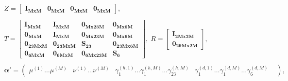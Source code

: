 \documentclass[11pt]{llncs} %
\begin{document}
\begin{center}
\begin{equation*}
\begin{array}{c}

Z =  \begin{bmatrix}
\mathbf{I_{MxM}} &  \mathbf{0_{M x M}} &  \mathbf{0_{M x M}} &  \mathbf{0_{M x M}} 
\end{bmatrix}, \\ \\

T =  \begin{bmatrix}
\mathbf{I_{MxM}} &  \mathbf{I_{M x M}} &  \mathbf{0_{M x 23M}} &  \mathbf{0_{M x 6M}} \\
\mathbf{0_{M x M}}& \mathbf{I_{MxM}} &  \mathbf{0_{M x 23M}} &  \mathbf{0_{M x 6M}}  \\
\mathbf{0_{23M x M}} &  \mathbf{0_{23M x M}} & \mathbf{S_{23}} &  \mathbf{0_{23M x 6M}} \\
 \mathbf{0_{6M x M}} &  \mathbf{0_{6M x M}} & \mathbf{0_{6M x 23M}} &  \mathbf{S_{6}}
\end{bmatrix}, \;

R =  \begin{bmatrix}
\mathbf{I_{2Mx2M}} \\
\mathbf{0_{29Mx2M}}
\end{bmatrix}, \\ \\

\boldsymbol{\alpha'} = \begin{pmatrix}
\mu^{(1)}\dots\mu^{(M)}&
\nu^{(1)}\dots\nu^{(M)}&
\gamma_{1}^{(h,1)}\dots\gamma_{1}^{(h,M)}\dots\gamma_{23}^{(h,M)}&
\gamma_{1}^{(d,1)}\dots\gamma_{1}^{(d,M)}\dots\gamma_{6}^{(d,M)}&
\end{pmatrix},\\ \\


\end{array}
\end{equation*}
\end{center}
\end{document}
